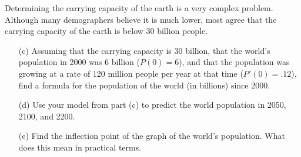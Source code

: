 \documentclass[11pt]{article}
\begin{document}
\begin{enumerate}
  \newpage

  Determining the carrying capacity of the earth is a very complex
  problem.  Although many demographers believe it is much lower, most
  agree that the carrying capacity of the earth is below 30 billion
  people.

  \begin{enumerate}
  \item[(c)] Assuming that the carrying capacity is 30 billion, that
    the world's population in 2000 was 6 billion ($P(0) = 6$), and
    that the population was growing at a rate of 120 million people
    per year at that time ($P'(0) = .12$), find a formula for the
    population of the world (in billions) since 2000.

    \vfill

    \newpage

  \item[(d)] Use your model from part (c) to predict the world
    population in 2050, 2100, and 2200.

    \vfill

  \item[(e)] Find the inflection point of the graph of the world's
    population.  What does this mean in practical terms.

    \vfill
  \end{enumerate}
  

\end{enumerate}
\end{document}
